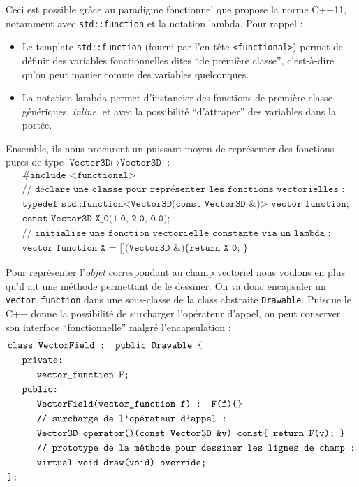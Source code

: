 \documentclass[12pt, letterpaper, twoside]{article}
\newcommand{\T}[1]{\texttt{#1}}
\begin{document}
Ceci est possible grâce au paradigme fonctionnel que propose la norme C++11, notamment avec \T{std::function} et la notation lambda. Pour rappel :

\begin{itemize}
\item Le template \T{std::function} (fourni par l'en-tête \T{<functional>}) permet de définir des variables fonctionnelles dites ``de première classe'', c'est-à-dire qu'on peut manier comme des variables quelconques.

\item La notation lambda permet d'instancier des fonctions de première classe génériques, \textit{inline}, et avec la possibilité ``d'attraper'' des variables dans la portée.
\end{itemize}

Ensemble, ils nous procurent un puissant moyen de représenter des fonctions pures de type $\T{Vector3D} \mapsto \T{Vector3D}$ :
\begin{align*}
	&\T{\#include <functional>}\\
	&\T{// déclare une classe pour représenter les fonctions vectorielles : }\\
	&\T{typedef std::function<Vector3D(const Vector3D \&)> vector\_function;}\\
	&\T{const Vector3D X\_0(1.0, 2.0, 0.0);}\\
	&\T{// initialise une fonction vectorielle constante via un lambda : }\\
	&\T{vector\_function X = [](Vector3D \&)\{ return X\_0; \}}
\end{align*}

\noindent Pour représenter l'\textit{objet} correspondant au champ vectoriel nous voulons en plus qu'il ait une méthode permettant de le dessiner. On va donc encapsuler un \T{vector\_function} dans une sous-classe de la class abstraite \T{Drawable}. Puisque le C++ donne la possibilité de surcharger l'opérateur d'appel, on peut conserver son interface ``fonctionnelle'' malgré l'encapsulation :
\begin{align*}
	&\T{class VectorField : public Drawable \{}\\
	&\indent \T{private:}\\
	& \indent \indent \T{vector\_function F;}\\
	&\indent \T{public:}\\
	& \indent \indent \T{VectorField(vector\_function f) : F(f)\{\}}\\
	& \indent \indent \T{// surcharge de l'opérateur d'appel :}\\
	& \indent \indent \T{Vector3D operator()(const Vector3D \&v)\ const\{ return F(v); \} }\\
	& \indent \indent \T{// prototype de la méthode pour dessiner les lignes de champ :}\\
	& \indent \indent \T{virtual void draw(void) override;}\\
	& \T{\};}
\end{align*}
\end{document}
